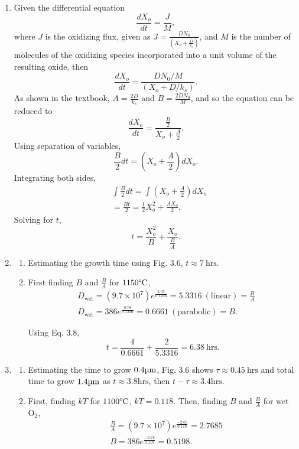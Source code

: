 \documentclass{article}
\begin{document}
\begin{enumerate}[label=\thesubsection]
		In conclusion, at \(T = 1000 \degree\mathrm{C}\), wet oxidation is preferable for the much faster growth rate up to 100nm.
		\setcounter{subsection}{3}
	\item Given the differential equation \[
	  \frac{dX_o}{dt} = \frac{J}{M},
	\] where \(J\) is the oxidizing flux, given as \(J = \frac{DN_0}{(X_o + \frac{D}{k_s})}\), and \(M\) is the number of molecules of the oxidizing species incorporated into a unit volume of the resulting oxide, then \[
	  \frac{dX_o}{dt} = \frac{DN_0/M}{(X_o + D/k_s)}.
	\]
	As shown in the textbook, \(A = \frac{2D}{k_s}\) and \(B = \frac{2DN_0}{M}\), and so the equation can be reduced to \[
	 \frac{dX_o}{dt} = \frac{\frac{B}{2}}{X_o+\frac{A}{2}}.
	\]
	Using separation of variables, \[
	  \frac{B}{2}dt = (X_o + \frac{A}{2})dX_o.
	\] 
	Integrating both sides,
	\begin{align*}
	  &\int \frac{B}{2}dt = \int(X_o + \frac{A}{2})dX_o \\
		&= \frac{Bt}{2} = \frac{1}{2}X_o^2 + \frac{AX_o}{2}.
	\end{align*}
	Solving for \(t\), 	
	\[
	  t = \frac{X_o^2}{B} + \frac{X_o}{\frac{B}{A}}.
	\]
	\setcounter{subsection}{6}
	\item
		\begin{enumerate}[label=(\alph*)]
			\item Estimating the growth time using Fig. 3.6, \(t \approx 7 \ \mathrm{hrs}\).
			\item First finding \(B\) and \(\frac{B}{A}\) for \(1150\degree\mathrm{C}\), 
				\begin{align*}
					&D_{\mathrm{wet}} = (9.7\times10^7)e^{\frac{2.05}{0.1226}} = 5.3316 \ \mathrm{(linear)} = \frac{B}{A}\\
					&D_{\mathrm{wet}} = 386e^{\frac{0.78}{0.1226}} = 0.6661 \ \mathrm{(parabolic)} = B.
				\end{align*}

				Using Eq. 3.8, \[
					t = \frac{4}{0.6661} + \frac{2}{5.3316} = 6.38 \ \mathrm{hrs}.
			\]
		\end{enumerate}
		\setcounter{subsection}{13}
		\item
		\begin{enumerate}[label=\alph*)]
			\item Estimating the time to grow \(0.4\micro\mathrm{m}\), Fig. 3.6 shows \(\tau \approx 0.45 \ \mathrm{hrs}\) and total time to grow \(1.4\micro\mathrm{m}\) as \(t \approx 3.8 \mathrm{hrs}\), then \(t-\tau \approx 3.4 \mathrm{hrs}.\)
	\item First, finding \(kT\) for \(1100\degree\mathrm{C}\), \(kT = 0.118\). Then, finding \(B\) and \(\frac{B}{A}\) for wet \(\mathrm{O_2}\), 
	\begin{align*}
		&\frac{B}{A} = (9.7\times10^7)e^{\frac{-2.05}{0.118}} = 2.7685 \\
		&B = 386e^{\frac{-0.78}{0.118}} = 0.5198.
	\end{align*}


\end{enumerate}
\end{enumerate}
\end{document}
